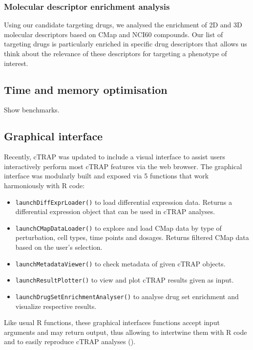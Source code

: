 \subsubsection{Molecular descriptor enrichment analysis}

Using our candidate targeting drugs, we analysed the enrichment of 2D and 3D molecular descriptors based on CMap and NCI60 compounds. Our list of targeting drugs is particularly enriched in specific drug descriptors that allows us think about the relevance of these descriptors for targeting a phenotype of interest.

\subsection{Time and memory optimisation}

Show benchmarks.

\subsection{Graphical interface}

Recently, cTRAP was updated to include a visual interface to assist users interactively perform most cTRAP features via the web browser. The graphical interface was modularly built and exposed via 5 functions that work harmoniously with R code:

\begin{itemize}
	\item \texttt{launchDiffExprLoader()} to load differential expression data. Returns a differential expression object that can be used in cTRAP analyses.
	\item \texttt{launchCMapDataLoader()} to explore and load CMap data by type of perturbation, cell types, time points and dosages. Returns filtered CMap data based on the user's selection.
	\item \texttt{launchMetadataViewer()} to check metadata of given cTRAP objects.
	\item \texttt{launchResultPlotter()} to view and plot cTRAP results given as input.
	\item \texttt{launchDrugSetEnrichmentAnalyser()} to analyse drug set enrichment and visualize respective results.
\end{itemize}

Like usual R functions, these graphical interfaces functions accept input arguments and may return output, thus allowing to intertwine them with R code and to easily reproduce cTRAP analyses ().

